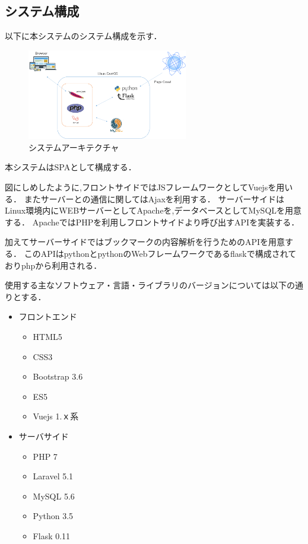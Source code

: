 \documentclass[a4paper,10pt,fleqn]{jsarticle}
\begin{document}
\subsection{システム構成}
以下に本システムのシステム構成を示す．
\begin{figure}[htbp]
  \begin{center}
    \includegraphics[clip,width=7.0cm]{./architecture.png}
    \caption{システムアーキテクチャ}
    \label{fig:system}
  \end{center}
\end{figure}
本システムはSPAとして構成する．\par
図にしめしたように,フロントサイドではJSフレームワークとしてVuejsを用いる． またサーバーとの通信に関してはAjaxを利用する．
サーバーサイドはLinux環境内にWEBサーバーとしてApacheを,データベースとしてMySQLを用意する． ApacheではPHPを利用しフロントサイドより呼び出すAPIを実装する．\par
加えてサーバーサイドではブックマークの内容解析を行うためのAPIを用意する． このAPIはpythonとpythonのWebフレームワークであるflaskで構成されておりphpから利用される．\\
\par
使用する主なソフトウェア・言語・ライブラリのバージョンについては以下の通りとする．
\begin{itemize}
 \item フロントエンド
    \begin{itemize}
    \item HTML5
    \item CSS3
      \item Bootstrap 3.6
      \item ES5
      \item Vuejs 1.ｘ系
     \end{itemize}
 \item サーバサイド
     \begin{itemize}
    \item PHP 7
    \item Laravel  5.1
      \item MySQL 5.6
      \item Python 3.5
      \item Flask 0.11
     \end{itemize}
\end{itemize}
\end{document}
